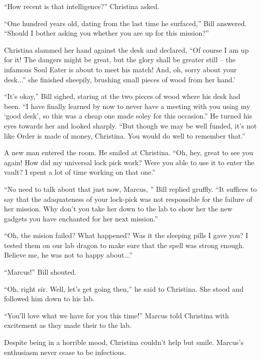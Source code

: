 \documentclass[showtrims,b6paper,draft,10pt]{memoir}
\begin{document}
``How recent is that intelligence?''  Christina asked.

``One hundred years old, dating from the last time he surfaced,''  Bill answered.  ``Should I bother asking you whether you are up for this mission?''

Christina slammed her hand against the desk and declared, ``Of course I am up for it!  The dangers might be great, but the glory shall be greater still -- the infamous Soul Eater is about to meet his match!  And, oh, sorry about your desk...''  she finished sheepily, brushing small pieces of wood from her hand.'

``It's okay,'' Bill sighed, staring at the two pieces of wood where his desk had been.  ``I have finally learned by now to never have a meeting with you using my `good desk', so this was a cheap one made soley for this occasion.''  He turned his eyes towards her and looked sharply.  ``But though we may be well funded, it's not like Order is made of money, Christina.  You would do well to remember that.''

A new man entered the room.  He smiled at Christina.  ``Oh, hey, great to see you again!  How did my universal lock pick work?  Were you able to use it to enter the vault?  I spent a lot of time working on that one.''

``No need to talk about that just now, Marcus, '' Bill replied gruffly.  ``It suffices to say that the adaquateness of your lock-pick was not responsible for the failure of her mission.  Why don't you take her down to the lab to show her the new gadgets you have enchanted for her next mission.''

``Oh, the mision failed?  What happened?  Was it the sleeping pills I gave you?  I tested them on our lab dragon to make sure that the spell was strong enough.  Believe me, he was not to happy about...''

``Marcus!''  Bill shouted.

``Oh, right sir.  Well, let's get going then,'' he said to Christina.  She stood and followed him down to his lab.

\timeskip

``You'll love what we have for you this time!'' Marcus told Christina with excitement as they made their to the lab.

Despite being in a horrible mood, Christina couldn't help but smile.  Marcus's enthusiasm never cease to be infectious.
\end{document}
